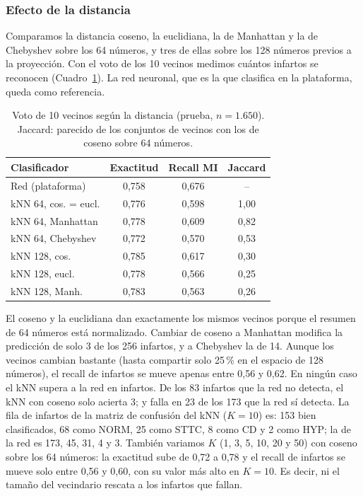 \documentclass[conference]{IEEEtran}
\begin{document}
\subsubsection{Efecto de la distancia}
Comparamos la distancia coseno, la euclidiana, la de Manhattan y la de Chebyshev sobre los 64 números, y tres de ellas sobre los 128 números previos a la proyección. Con el voto de los 10 vecinos medimos cuántos infartos se reconocen (Cuadro~\ref{tab:metricas}). La red neuronal, que es la que clasifica en la plataforma, queda como referencia.

\begin{table}[t]
\caption{Voto de 10 vecinos según la distancia (prueba, $n=1.650$). Jaccard: parecido de los conjuntos de vecinos con los de coseno sobre 64 números.}
\label{tab:metricas}
\centering\footnotesize\setlength{\tabcolsep}{3pt}
\begin{tabular}{@{}lccc@{}}
\toprule
Clasificador & Exactitud & Recall MI & Jaccard \\
\midrule
Red (plataforma) & 0,758 & 0,676 & -- \\
kNN 64, cos. = eucl. & 0,776 & 0,598 & 1,00 \\
kNN 64, Manhattan & 0,778 & 0,609 & 0,82 \\
kNN 64, Chebyshev & 0,772 & 0,570 & 0,53 \\
kNN 128, cos. & 0,785 & 0,617 & 0,30 \\
kNN 128, eucl. & 0,778 & 0,566 & 0,25 \\
kNN 128, Manh. & 0,783 & 0,563 & 0,26 \\
\bottomrule
\end{tabular}
\end{table}

El coseno y la euclidiana dan exactamente los mismos vecinos porque el resumen de 64 números está normalizado. Cambiar de coseno a Manhattan modifica la predicción de solo 3 de los 256 infartos, y a Chebyshev la de 14. Aunque los vecinos cambian bastante (hasta compartir solo 25\,\% en el espacio de 128 números), el recall de infartos se mueve apenas entre 0,56 y 0,62. En ningún caso el kNN supera a la red en infartos. De los 83 infartos que la red no detecta, el kNN con coseno solo acierta 3; y falla en 23 de los 173 que la red sí detecta. La fila de infartos de la matriz de confusión del kNN ($K=10$) es: 153 bien clasificados, 68 como NORM, 25 como STTC, 8 como CD y 2 como HYP; la de la red es 173, 45, 31, 4 y 3. También variamos $K$ (1, 3, 5, 10, 20 y 50) con coseno sobre los 64 números: la exactitud sube de 0,72 a 0,78 y el recall de infartos se mueve solo entre 0,56 y 0,60, con su valor más alto en $K=10$. Es decir, ni el tamaño del vecindario rescata a los infartos que fallan.
\end{document}
